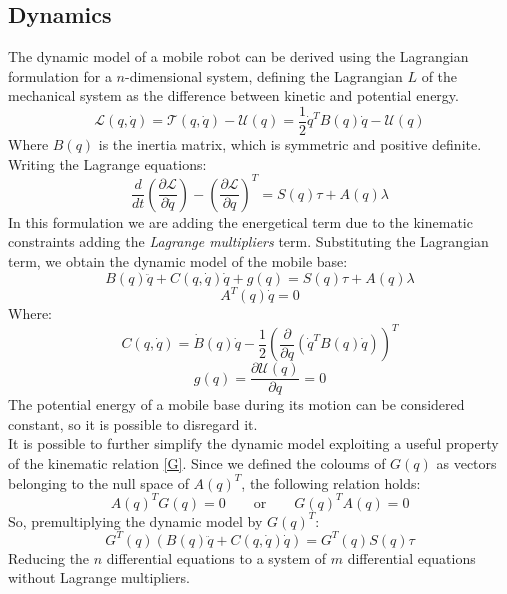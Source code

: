 \subsection{Dynamics}
The dynamic model of a mobile robot can be derived using the Lagrangian formulation for a $n$-dimensional system, defining the Lagrangian $L$ of the mechanical system as the difference between kinetic and potential energy.
\begin{equation}
\mathcal{L}(q,\dot{q})=\mathcal{T}(q,\dot{q})-\mathcal{U}(q)=\frac{1}{2}\dot{q}^T B(q)\dot{q} - \mathcal{U}(q)
\end{equation}
Where $B(q)$ is the inertia matrix, which is symmetric and positive definite.\\
Writing the Lagrange equations:
\begin{equation}
\frac{d}{dt}\left(\frac{\partial\mathcal{L}}{\partial\dot{q}} \right) - \left(\frac{\partial\mathcal{L}}{\partial q} \right)^T=S(q)\tau+A(q)\lambda
\end{equation}
In this formulation we are adding the energetical term due to the kinematic constraints adding the \textit{Lagrange multipliers} term. 
Substituting the Lagrangian term, we obtain the dynamic model of the mobile base:
\begin{equation}
B(q)\ddot{q}+C(q,\dot{q})\dot{q}+g(q) = S(q)\tau+A(q)\lambda
\end{equation}
\begin{equation*} 
A^T \left( q \right)\dot{q} =0  
\end{equation*}
Where:
\begin{equation}
C(q,\dot{q})=\dot{B}(q)\dot{q}-\frac{1}{2}\left(\frac{\partial}{\partial q}\left( \dot{q}^T B(q)\dot{q}\right)\right)^T
\end{equation}
\begin{equation}
g(q) = \frac{\partial\mathcal{U}(q)}{\partial q} = 0
\end{equation}
The potential energy of a mobile base during its motion can be considered constant, so it is possible to disregard it.\\
It is possible to further simplify the dynamic model exploiting a useful property of the kinematic relation \ref{G}. Since we defined the coloums of $G(q)$ as vectors belonging to the null space of $A(q)^T$, the following relation holds:
\begin{equation}
A(q)^T G(q) = 0 \qquad\textrm{or}\qquad G(q)^T A(q) = 0
\end{equation}
So, premultiplying the dynamic model by $G(q)^T$:
\begin{equation}
G^T(q)\left(B(q)\ddot{q}+C(q,\dot{q})\dot{q}\right) = G^T(q)S(q)\tau
\end{equation}
Reducing the $n$ differential equations to a system of $m$ differential equations without Lagrange multipliers.
